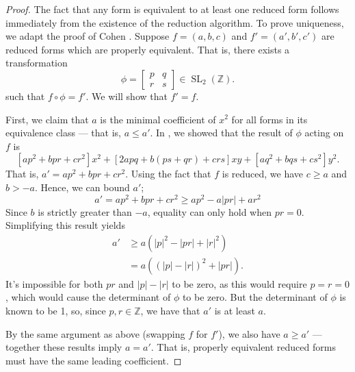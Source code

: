 \documentclass[honours,12pt]{unswthesis}
\newcommand{\Z}{\mathbb{Z}} %
\DeclareMathOperator{\SL}{SL}
\newcommand{\bmat}[1]{\begin{bmatrix}#1\end{bmatrix}}
\numberwithin{equation}{section}
\begin{document}
\begin{proof}
    The fact that any form is equivalent to at least one reduced form follows immediately from the existence of the reduction algorithm.
    To prove uniqueness, we adapt the proof of Cohen \cite[Prop.\,5.3.3]{cohen}.
    Suppose $f = (a, b, c)$ and $f' = (a', b', c')$ are reduced forms which are properly equivalent.
    That is, there exists a transformation 
    $$\phi = \bmat{p & q \\ r & s} \in \SL_2(\Z).$$
    such that $f \circ \phi = f'$.
    We will show that $f' = f$.

    First, we claim that $a$ is the minimal coefficient of $x^2$ for all forms in its equivalence class --- that is, $a \leq a'$.
    In , we showed that the result of $\phi$ acting on $f$ is
    $$\left[ap^2 + bpr + cr^2 \right] x^2
        + \left[ 2apq + b(ps + qr) + crs \right] xy
        + \left[ aq^2 + bqs + cs^2 \right] y^2.$$
    That is, $a' = ap^2 + bpr + cr^2$.
    Using the fact that $f$ is reduced, we have $c \geq a$ and $b > -a$.
    Hence, we can bound $a'$;
    $$a' = ap^2 + bpr + cr^2 \geq ap^2 - a|pr| + ar^2$$
    Since $b$ is strictly greater than $-a$, equality can only hold when $pr = 0$.
    Simplifying this result yields
    \begin{align*}
        a' &\geq a \left( |p|^2 - |pr| + |r|^2 \right) \\
        &= a \left( (|p| - |r|)^2 + |pr| \right).
    \end{align*}
    It's impossible for both $pr$ and $|p| - |r|$ to be zero, as this would require $p = r = 0$,
    which would cause the determinant of $\phi$ to be zero.
    But the determinant of $\phi$ is known to be 1, so, since $p, r \in \Z$, we have that $a'$ is at least $a$.

    By the same argument as above (swapping $f$ for $f'$), we also have $a \geq a'$ --- together these results imply $a = a'$.
    That is, properly equivalent reduced forms must have the same leading coefficient.
    

\end{proof}
\end{document}
